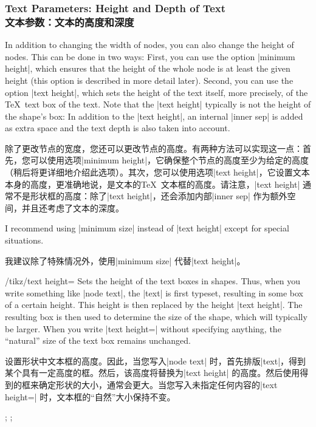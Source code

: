 \subsubsection{Text Parameters: Height and Depth of Text\\文本参数：文本的高度和深度}

In addition to changing the width of nodes, you can also change the height of
nodes. This can be done in two ways: First, you can use the option
|minimum height|, which ensures that the height of the whole node is at least
the given height (this option is described in more detail later). Second, you
can use the option |text height|, which sets the height of the text itself,
more precisely, of the \TeX\ text box of the text. Note that the |text height|
typically is not the height of the shape's box: In addition to the
|text height|, an internal |inner sep| is added as extra space and the text
depth is also taken into account.

除了更改节点的宽度，您还可以更改节点的高度。有两种方法可以实现这一点：首先，您可以使用选项|minimum height|，它确保整个节点的高度至少为给定的高度（稍后将更详细地介绍此选项）。其次，您可以使用选项|text height|，它设置文本本身的高度，更准确地说，是文本的\TeX\ 文本框的高度。请注意，|text height| 通常不是形状框的高度：除了|text height|，还会添加内部|inner sep| 作为额外空间，并且还考虑了文本的深度。

I recommend using |minimum size| instead of |text height| except for special
situations.

我建议除了特殊情况外，使用|minimum size| 代替|text height|。

\begin{key}{/tikz/text height=}
    Sets the height of the text boxes in shapes. Thus, when you write something
    like |node {text}|, the |text| is first typeset, resulting in some box of a
    certain height. This height is then replaced by the height |text height|.
    The resulting box is then used to determine the size of the shape, which
    will typically be larger. When you write |text height=| without specifying
    anything, the ``natural'' size of the text box remains unchanged.
    
    设置形状中文本框的高度。因此，当您写入|node {text}| 时，首先排版|text|，得到某个具有一定高度的框。然后，该高度将替换为|text height| 的高度。然后使用得到的框来确定形状的大小，通常会更大。当您写入未指定任何内容的|text height=| 时，文本框的“自然”大小保持不变。

\begin{codeexample}[]
\tikz {};
\tikz {};
\end{codeexample}
\end{key}

